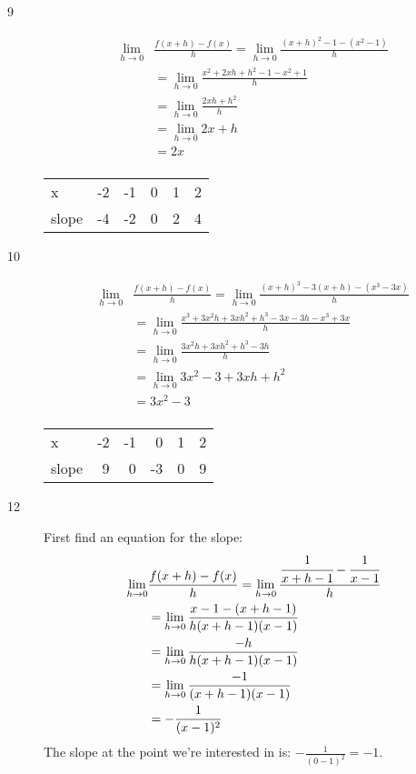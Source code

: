 \documentclass{exam}
\begin{document}
\begin{description}

\item[9]
\begin{align*}
  \lim_{h \to 0} &\frac{f(x+h) - f(x)}{h} = \lim_{h \to 0} \frac{(x+h)^2 - 1 - (x^2 - 1)}{h} \\
  &= \lim_{h \to 0} \frac{x^2 + 2xh + h^2 - 1 - x^2 + 1}{h} \\
  &= \lim_{h \to 0} \frac{2xh + h^2}{h} \\
  &= \lim_{h \to 0} 2x + h \\
  &= 2x \\
\end{align*}

\begin{tabular}{lrrrrr}
\toprule
x     & -2 & -1 & 0 & 1 & 2 \\
slope & -4 & -2 & 0 & 2 & 4 \\
\bottomrule
\end{tabular}

\item[10]
\begin{align*}
  \lim_{h \to 0} &\frac{f(x+h) - f(x)}{h} = \lim_{h \to 0} \frac{(x+h)^3 - 3(x+h) - (x^3 - 3x)}{h} \\
  &= \lim_{h \to 0} \frac{x^3 + 3x^2h + 3xh^2 + h^3 - 3x - 3h - x^3 + 3x}{h} \\
  &= \lim_{h \to 0} \frac{3x^2h + 3xh^2 + h^3 - 3h }{h} \\
  &= \lim_{h \to 0} 3x^2 - 3 + 3xh + h^2 \\
  &= 3x^2 - 3 \\
\end{align*}

\begin{tabular}{lrrrrr}
\toprule
x     & -2 & -1 &  0 & 1 & 2 \\
slope &  9 &  0 & -3 & 0 & 9 \\
\bottomrule
\end{tabular}

\item[12]
First find an equation for the slope:
\begin{align*}
  \lim_{h \to 0} &\frac{f(x+h) - f(x)}{h} = \lim_{h \to 0} \frac{\cfrac{1}{x+h-1} - \cfrac{1}{x-1}}{h} \\
  &= \lim_{h \to 0} \frac{x - 1 - (x+h-1)}{h(x+h-1)(x-1)} \\
  &= \lim_{h \to 0} \frac{-h}{h(x+h-1)(x-1)} \\
  &= \lim_{h \to 0} \frac{-1}{(x+h-1)(x-1)} \\
  &= - \frac{1}{(x-1)^2} \\
\end{align*}
The slope at the point we're interested in is: $- \frac{1}{(0-1)^2} = -1$.


\end{description}
\end{document}
